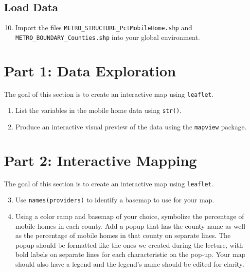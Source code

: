 \documentclass{tufte-handout}
\begin{document}
\vspace{3mm}
\subsection{Load Data}
\begin{enumerate}[label=\alph*.]
\setcounter{enumi}{9}
\item Import the files \texttt{METRO\_STRUCTURE\_PctMobileHome.shp} and \\ \texttt{METRO\_BOUNDARY\_Counties.shp} into your global environment.
\end{enumerate}

\vspace{5mm}
\section{Part 1: Data Exploration}
The goal of this section is to create an interactive map using \texttt{leaflet}. 
\begin{enumerate}
\item List the variables in the mobile home data using \texttt{str()}.
\item Produce an interactive visual preview of the data using the \texttt{mapview} package.
\end{enumerate}

\vspace{5mm}
\section{Part 2: Interactive Mapping}
The goal of this section is to create an interactive map using \texttt{leaflet}. 
\begin{enumerate}
\setcounter{enumi}{2}
\item Use \texttt{names(providers)} to identify a basemap to use for your map.
\item Using a color ramp and basemap of your choice, symbolize the percentage of mobile homes in each county. Add a popup that has the county name as well as the percentage of mobile homes in that county on separate lines. The popup should be formatted like the ones we created during the lecture, with bold labels on separate lines for each characteristic on the pop-up. Your map should also have a legend and the legend's name should be edited for clarity. 
\end{enumerate}
\end{document}
